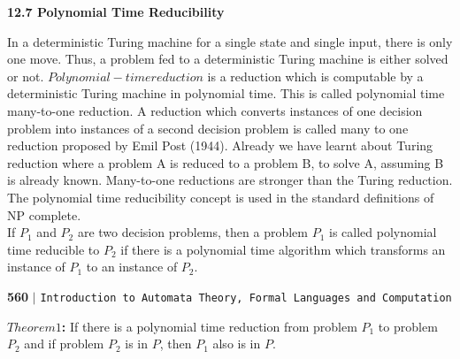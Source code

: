 \documentclass[11pt]{article}
\begin{document}
\vspace*{0.5cm}
\large{
\textbf{12.7 Polynomial Time Reducibility}\\
}

\vspace*{0.2cm}
In a deterministic Turing machine for a single state and single input, there is only one move. Thus,
a problem fed to a deterministic Turing machine is either solved or not. $Polynomial-time reduction$
is a reduction which is computable by a deterministic Turing machine in polynomial time. This is
called polynomial time many-to-one reduction. A reduction which converts instances of one decision
problem into instances of a second decision problem is called many to one reduction proposed by
Emil Post (1944). Already we have learnt about Turing reduction where a problem A is reduced to a
problem B, to solve A, assuming B is already known. Many-to-one reductions are stronger than the
Turing reduction.\\
\hspace*{0.5cm} The polynomial time reducibility concept is used in the standard definitions of NP complete.\\
\hspace*{0.5cm} If $P _{1}$ and $P _{2}$ are two decision problems, then a problem $P_{1}$ is called polynomial time reducible to $P _{2}$ if
there is a polynomial time algorithm which transforms an instance of $P _{1}$ to an instance of $P _{2}$.\\


\newpage
\begin{flushleft}
    \textbf{560}\hspace*{0.1cm} \textbf{$|$} \hspace*{0.1cm} \texttt{Introduction to Automata Theory, Formal Languages and Computation}
  \end{flushleft}

\vspace*{0.5cm}
\textbf{$Theorem 1$:} If there is a polynomial time reduction from problem $P_{1}$ to problem $P_{2}$ and if problem $P_{2}$ is
in $P$, then $P_{1}$ also is in $P$.\\
\end{document}
